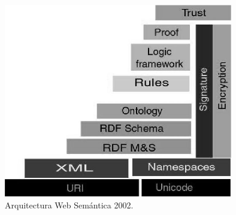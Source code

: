 \begin{figure}[!htbp]
\centering
	\includegraphics[width=10cm]{images/sw-stack-2002}
\caption{Arquitectura Web Semántica 2002.}
\label{fig:stack-2002}
\end{figure}

